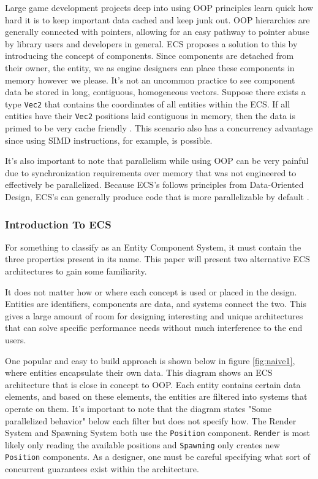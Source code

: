 Large game development projects deep into using OOP principles learn quick how hard it is to keep important data cached and keep junk out. OOP hierarchies are generally connected with pointers, allowing for an easy pathway to pointer abuse by library users and developers in general. ECS proposes a solution to this by introducing the concept of components. Since components are detached from their owner, the entity, we as engine designers can place these components in memory however we please. It's not an uncommon practice to see component data be stored in long, contiguous, homogeneous vectors. Suppose there exists a type \texttt{Vec2} that contains the coordinates of all entities within the ECS. If all entities have their \texttt{Vec2} positions laid contiguous in memory, then the data is primed to be very cache friendly \cite{Wiebusch2012}\cite{SanderMertensECS}. This scenario also has a concurrency advantage since using SIMD instructions, for example, is possible. 

It's also important to note that parallelism while using OOP can be very painful due to synchronization requirements over memory that was not engineered to effectively be parallelized. Because ECS's follows principles from Data-Oriented Design, ECS's can generally produce code that is more parallelizable by default \cite{RomeoPHD}.

\subsubsection{Introduction To ECS}
For something to classify as an Entity Component System, it must contain the three properties present in its name. This paper will present two alternative ECS architectures to gain some familiarity. 

It does not matter how or where each concept is used or placed in the design. Entities are identifiers, components are data, and systems connect the two. This gives a large amount of room for designing interesting and unique architectures that can solve specific performance needs without much interference to the end users. 

One popular and easy to build approach is shown below in figure \ref{fig:naive1}, where entities encapsulate their own data. This diagram shows an ECS architecture that is close in concept to OOP. Each entity contains certain data elements, and based on these elements, the entities are filtered into systems that operate on them. It's important to note that the diagram states "Some parallelized behavior" below each filter but does not specify how. The Render System and Spawning System both use the \texttt{Position} component. \texttt{Render} is most likely only reading the available positions and \texttt{Spawning} only creates new \texttt{Position} components. As a designer, one must be careful specifying what sort of concurrent guarantees exist within the architecture. 

